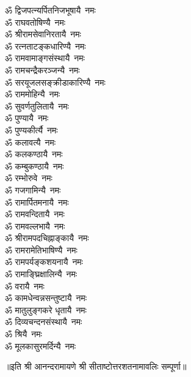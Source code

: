 \begin{multicols}{2}
\begin{flushleft}
ॐ द्विजपत्न्यर्पितनिजभूषायै~नमः\\
ॐ राघवतोषिण्यै~नमः\\
ॐ श्रीरामसेवानिरतायै~नमः\\
ॐ रत्नताटङ्कधारिण्यै~नमः\\
ॐ रामवामाङ्गसंस्थायै~नमः\\
ॐ रामचन्द्रैकरञ्जन्यै~नमः\\
ॐ सरयूजलसङ्क्रीडाकारिण्यै~नमः\\
ॐ राममोहिन्यै~नमः\hfill{}\\
ॐ सुवर्णतुलितायै~नमः\\
ॐ पुण्यायै~नमः\\
ॐ पुण्यकीर्त्यै~नमः\\
ॐ कलावत्यै~नमः\\
ॐ कलकण्ठायै~नमः\\
ॐ कम्बुकण्ठायै~नमः\\
ॐ रम्भोरुवे~नमः\\
ॐ गजगामिन्यै~नमः\\
ॐ रामार्पितमनायै~नमः\\
ॐ रामवन्दितायै~नमः\hfill{}\\
ॐ रामवल्लभायै~नमः\\
ॐ श्रीरामपदचिह्नाङ्कायै~नमः\\
ॐ रामरामेतिभाषिण्यै~नमः\\
ॐ रामपर्यङ्कशयनायै~नमः\\
ॐ रामाङ्घ्रिक्षालिन्यै~नमः\\
ॐ वरायै~नमः\\
ॐ कामधेन्वन्नसन्तुष्टायै~नमः\\
ॐ मातुलुङ्गकरे धृतायै~नमः\\
ॐ दिव्यचन्दनसंस्थायै~नमः\\
ॐ श्रियै~नमः\hfill{}\\
ॐ मूलकासुरमर्दिन्यै~नमः\\
\end{flushleft}
\end{multicols}
॥इति श्री आनन्दरामायणे श्री सीताष्टोत्तरशतनामावलिः सम्पूर्णा॥
